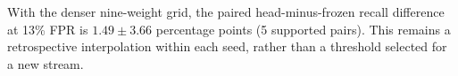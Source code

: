 With the denser nine-weight grid, the paired head-minus-frozen recall difference at 13\% FPR is $1.49 \pm 3.66$ percentage points (5 supported pairs). This remains a retrospective interpolation within each seed, rather than a threshold selected for a new stream.
